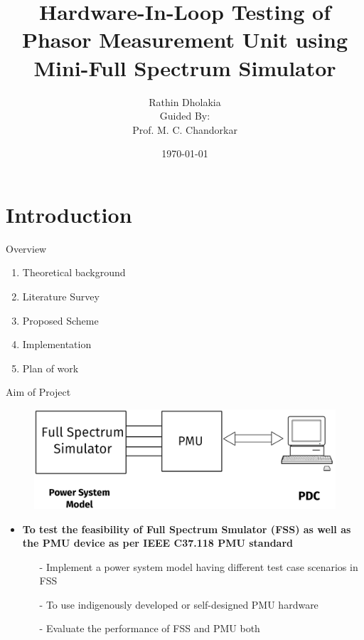 \documentclass{beamer}
\title{ Hardware-In-Loop Testing of Phasor Measurement Unit using Mini-Full Spectrum Simulator}
\date{\today}
\author{Rathin Dholakia \\Guided By:\\ Prof. M. C. Chandorkar}
\institute{MTP Stage - 1}
\begin{document}
  \maketitle
  \section{Introduction}


  \begin{frame}{Overview}
 	\begin{enumerate}
  	\item Theoretical background
  	\item Literature Survey
  	\item Proposed Scheme
  	\item Implementation
  	\item Plan of work
 	\end{enumerate}
   \end{frame}
 
 
 \begin{frame}{Aim of Project}
 \begin{figure}
 \includegraphics*[scale=0.1]{Aim.png}
 \end{figure}
 \begin{itemize}
 \item \textbf{To test the feasibility of Full Spectrum Smulator (FSS) as well as the PMU device as per IEEE C37.118 PMU standard}
 \begin{itemize}
	 \item[-] Implement a power system model having different test case scenarios in FSS
  	\item[-] To use indigenously developed or self-designed PMU hardware
	 \item[-] Evaluate the performance of FSS and PMU both
 \end{itemize}
 
 \end{itemize}
 \end{frame} 
 
\end{document}
